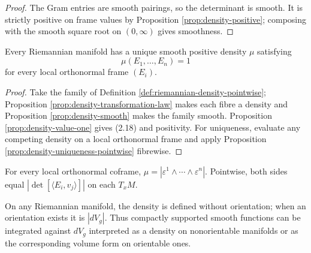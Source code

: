 \begin{proof}
\leanok
{}
\sketch The Gram entries are smooth pairings, so the determinant is smooth. It is strictly positive on frame values by Proposition \ref{prop:density-positive}; composing with the smooth square root on $(0,\infty)$ gives smoothness.
\end{proof}

\begin{proposition}\label{prop:riemannian-density}
\leanok
{}
Every Riemannian manifold has a unique smooth positive density $\mu$ satisfying
\begin{equation}
\mu(E_1,\ldots,E_n)=1 \tag{2.18}
\end{equation}
for every local orthonormal frame $(E_i)$.
\end{proposition}

\begin{proof}
\leanok
{}
\sketch Take the family of Definition \ref{def:riemannian-density-pointwise}; Proposition \ref{prop:density-transformation-law} makes each fibre a density and Proposition \ref{prop:density-smooth} makes the family smooth. Proposition \ref{prop:density-value-one} gives (2.18) and positivity. For uniqueness, evaluate any competing density on a local orthonormal frame and apply Proposition \ref{prop:density-uniqueness-pointwise} fibrewise.
\end{proof}

\begin{proposition}\label{prop:riemannian-density-formula}
\leanok
{}
For every local orthonormal coframe,
$\mu=|\varepsilon^1\wedge\cdots\wedge\varepsilon^n|$. Pointwise, both sides
equal $|\det[\langle E_i,v_j\rangle]|$ on each $T_xM$.
\end{proposition}

On any Riemannian manifold, the density is defined without orientation; when an orientation exists it is $|dV_g|$. Thus compactly supported smooth functions can be integrated against $dV_g$ interpreted as a density on nonorientable manifolds or as the corresponding volume form on orientable ones.

